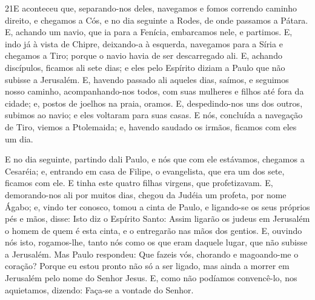 \lettrine{21} E aconteceu que, separando-nos deles, navegamos
e fomos correndo caminho direito, e chegamos a Cós, e no dia
seguinte a Rodes, de onde passamos a Pátara. E, achando um
navio, que ia para a Fenícia, embarcamos nele, e partimos. E,
indo já à vista de Chipre, deixando-a à esquerda, navegamos para a
Síria e chegamos a Tiro; porque o navio havia de ser descarregado
ali. E, achando discípulos, ficamos ali sete dias; e eles pelo
Espírito diziam a Paulo que não subisse a Jerusalém. E, havendo
passado ali aqueles dias, saímos, e seguimos nosso caminho,
acompanhando-nos todos, com suas mulheres e filhos até fora da
cidade; e, postos de joelhos na praia, oramos. E, despedindo-nos
uns dos outros, subimos ao navio; e eles voltaram para suas casas.
E nós, concluída a navegação de Tiro, viemos a Ptolemaida; e,
havendo saudado os irmãos, ficamos com eles um dia.

E no dia seguinte, partindo dali Paulo, e nós que com ele
estávamos, chegamos a Cesaréia; e, entrando em casa de Filipe, o
evangelista, que era um dos sete, ficamos com ele. E tinha este
quatro filhas virgens, que profetizavam. E, demorando-nos ali
por muitos dias, chegou da Judéia um profeta, por nome Ágabo;
e, vindo ter conosco, tomou a cinta de Paulo, e ligando-se os
seus próprios pés e mãos, disse: Isto diz o Espírito Santo: Assim
ligarão os judeus em Jerusalém o homem de quem é esta cinta, e o
entregarão nas mãos dos gentios. E, ouvindo nós isto,
rogamos-lhe, tanto nós como os que eram daquele lugar, que não
subisse a Jerusalém. Mas Paulo respondeu: Que fazeis vós,
chorando e magoando-me o coração? Porque eu estou pronto não só a
ser ligado, mas ainda a morrer em Jerusalém pelo nome do Senhor
Jesus. E, como não podíamos convencê-lo, nos aquietamos,
dizendo: Faça-se a vontade do Senhor.

